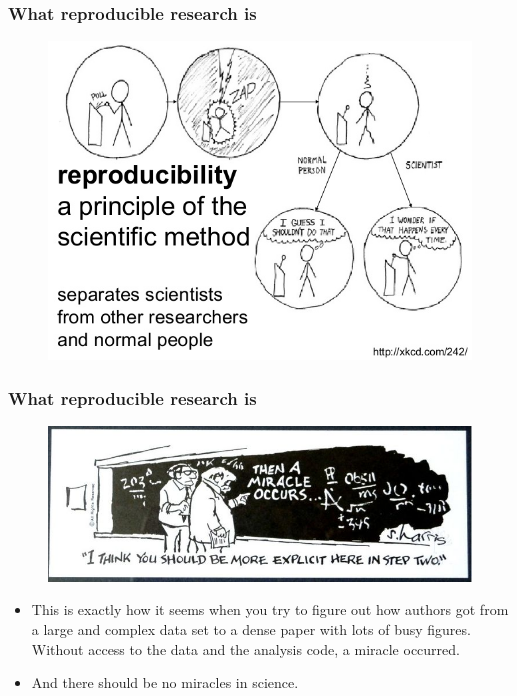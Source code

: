 \documentclass{beamer}
\begin{document}
\begin{frame}
\frametitle{What reproducible research is}
\begin{figure}
\includegraphics[scale=0.45]{figures/001.jpg}
\end{figure}
\end{frame}


\begin{frame}
\frametitle{What reproducible research is}
\begin{figure}
\includegraphics[scale=0.45]{figures/thenamiracleoccurs.jpg}
\end{figure}
\footnotesize
\begin{itemize}
\item This is exactly how it seems when you try to figure out how authors got from a large and complex data set to a dense paper with lots of busy figures. \\Without access to the data and the analysis code, a miracle occurred.
\item And  there should be {\sc no miracles in science.} \citep{Markowetz:2016cs}
\end{itemize}
\end{frame}
\end{document}
